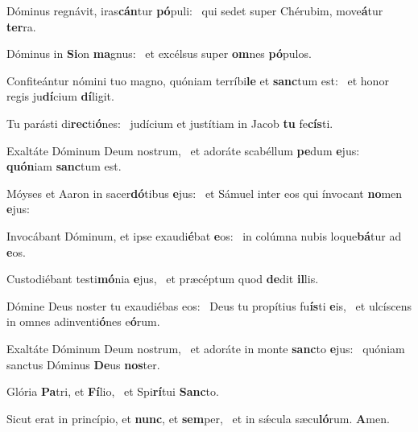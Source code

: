 \item Dóminus regnávit, iras\textbf{cán}tur \textbf{pó}puli:~\psstar{} qui sedet super Chérubim, move\textbf{á}tur \textbf{ter}ra.
\item Dóminus in \textbf{Si}on \textbf{ma}gnus:~\psstar{} et excélsus super \textbf{om}nes \textbf{pó}pulos.
\item Confiteántur nómini tuo magno, quóniam terríbi\textbf{le} et \textbf{sanc}tum est:~\psstar{} et honor regis ju\textbf{dí}cium \textbf{dí}ligit.
\item Tu parásti di\textbf{rec}ti\textbf{ó}nes:~\psstar{} judícium et justítiam in Jacob \textbf{tu} fe\textbf{cís}ti.
\item Exaltáte Dóminum Deum nostrum,~\pscross{} et adoráte scabéllum \textbf{pe}dum \textbf{e}jus:~\psstar{} \textbf{quón}iam \textbf{sanc}tum est.
\item Móyses et Aaron in sacer\textbf{dó}tibus \textbf{e}jus:~\psstar{} et Sámuel inter eos qui ínvocant \textbf{no}men \textbf{e}jus:
\item Invocábant Dóminum, et ipse exaudi\textbf{é}bat \textbf{e}os:~\psstar{} in colúmna nubis loque\textbf{bá}tur ad \textbf{e}os.
\item Custodiébant testi\textbf{mó}nia \textbf{e}jus,~\psstar{} et præcéptum quod \textbf{de}dit \textbf{il}lis.
\item Dómine Deus noster tu exaudiébas eos:~\pscross{} Deus tu propítius fu\textbf{ís}ti \textbf{e}is,~\psstar{} et ulcíscens in omnes adinventi\textbf{ó}nes e\textbf{ó}rum.
\item Exaltáte Dóminum Deum nostrum,~\pscross{} et adoráte in monte \textbf{sanc}to \textbf{e}jus:~\psstar{} quóniam sanctus Dóminus \textbf{De}us \textbf{nos}ter.
\item Glória \textbf{Pa}tri, et \textbf{Fí}lio,~\psstar{} et Spi\textbf{rí}tui \textbf{Sanc}to.
\item Sicut erat in princípio, et \textbf{nunc}, et \textbf{sem}per,~\psstar{} et in sǽcula sæcu\textbf{ló}rum. \textbf{A}men.
